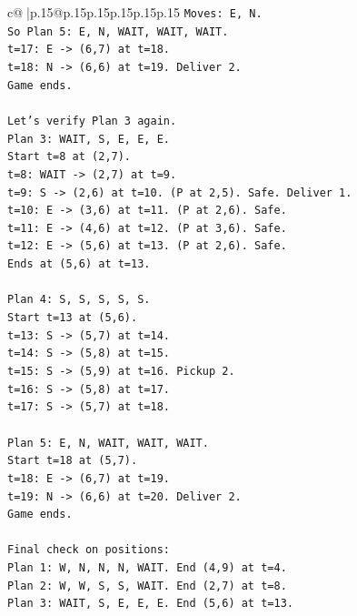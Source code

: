 \documentclass{article}
\begin{document}
{\begin{supertabular}{c@{$\;$}|p{.15\linewidth}@{}p{.15\linewidth}p{.15\linewidth}p{.15\linewidth}p{.15\linewidth}p{.15\linewidth}}
{{{\texttt{Moves: E, N.} \\
\texttt{So Plan 5: E, N, WAIT, WAIT, WAIT.} \\
\texttt{t=17: E {-}> (6,7) at t=18.} \\
\texttt{t=18: N {-}> (6,6) at t=19. Deliver 2.} \\
\texttt{Game ends.} \\
\\ 
\texttt{Let's verify Plan 3 again.} \\
\texttt{Plan 3: WAIT, S, E, E, E.} \\
\texttt{Start t=8 at (2,7).} \\
\texttt{t=8: WAIT {-}> (2,7) at t=9.} \\
\texttt{t=9: S {-}> (2,6) at t=10. (P at 2,5). Safe. Deliver 1.} \\
\texttt{t=10: E {-}> (3,6) at t=11. (P at 2,6). Safe.} \\
\texttt{t=11: E {-}> (4,6) at t=12. (P at 3,6). Safe.} \\
\texttt{t=12: E {-}> (5,6) at t=13. (P at 2,6). Safe.} \\
\texttt{Ends at (5,6) at t=13.} \\
\\ 
\texttt{Plan 4: S, S, S, S, S.} \\
\texttt{Start t=13 at (5,6).} \\
\texttt{t=13: S {-}> (5,7) at t=14.} \\
\texttt{t=14: S {-}> (5,8) at t=15.} \\
\texttt{t=15: S {-}> (5,9) at t=16. Pickup 2.} \\
\texttt{t=16: S {-}> (5,8) at t=17.} \\
\texttt{t=17: S {-}> (5,7) at t=18.} \\
\\ 
\texttt{Plan 5: E, N, WAIT, WAIT, WAIT.} \\
\texttt{Start t=18 at (5,7).} \\
\texttt{t=18: E {-}> (6,7) at t=19.} \\
\texttt{t=19: N {-}> (6,6) at t=20. Deliver 2.} \\
\texttt{Game ends.} \\
\\ 
\texttt{Final check on positions:} \\
\texttt{Plan 1: W, N, N, N, WAIT. End (4,9) at t=4.} \\
\texttt{Plan 2: W, W, S, S, WAIT. End (2,7) at t=8.} \\
\texttt{Plan 3: WAIT, S, E, E, E. End (5,6) at t=13.} \\
}}}
\end{supertabular}}
\end{document}
